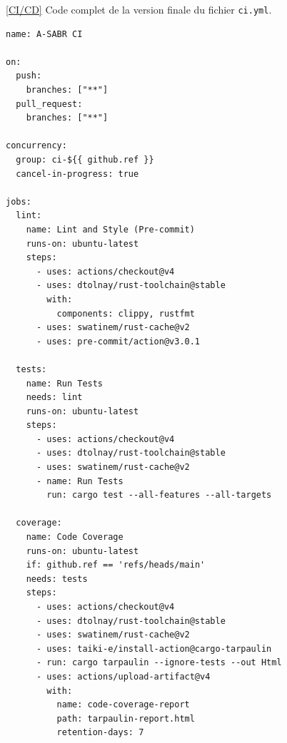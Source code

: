 \documentclass{article}
\begin{document}
\newpage
{}
\label{CodeCIyml}
\ref{CI/CD}
Code complet de la version finale du fichier \texttt{ci.yml}.
\begin{verbatim}
name: A-SABR CI

on:
  push:
    branches: ["**"]
  pull_request:
    branches: ["**"]

concurrency:
  group: ci-${{ github.ref }}
  cancel-in-progress: true

jobs:
  lint:
    name: Lint and Style (Pre-commit)
    runs-on: ubuntu-latest
    steps:
      - uses: actions/checkout@v4
      - uses: dtolnay/rust-toolchain@stable
        with:
          components: clippy, rustfmt
      - uses: swatinem/rust-cache@v2
      - uses: pre-commit/action@v3.0.1

  tests:
    name: Run Tests
    needs: lint
    runs-on: ubuntu-latest
    steps:
      - uses: actions/checkout@v4
      - uses: dtolnay/rust-toolchain@stable
      - uses: swatinem/rust-cache@v2
      - name: Run Tests
        run: cargo test --all-features --all-targets

  coverage:
    name: Code Coverage
    runs-on: ubuntu-latest
    if: github.ref == 'refs/heads/main'
    needs: tests
    steps:
      - uses: actions/checkout@v4
      - uses: dtolnay/rust-toolchain@stable
      - uses: swatinem/rust-cache@v2
      - uses: taiki-e/install-action@cargo-tarpaulin
      - run: cargo tarpaulin --ignore-tests --out Html
      - uses: actions/upload-artifact@v4
        with:
          name: code-coverage-report
          path: tarpaulin-report.html
          retention-days: 7
\end{verbatim}
\end{document}
